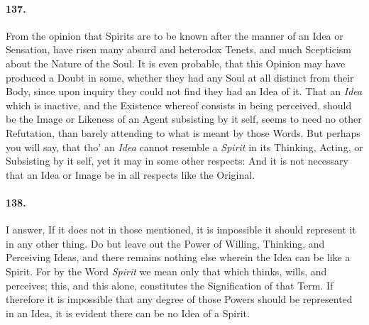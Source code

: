 \documentclass[]{article}
\newenvironment{sectionbody}{\begin{multicols}{2}}{\end{multicols}}
\begin{document}
\begin{sectionbody}
\paragraph{137.} From the opinion that Spirits are to be known after the manner of
an Idea or Sensation, have risen many absurd and heterodox
Tenets, and much Scepticism about the Nature of the Soul.  It is
even probable, that this Opinion may have produced a Doubt in
some, whether they had any Soul at all distinct from their Body,
since upon inquiry they could not find they had an Idea of it.
That an \emph{Idea} which is inactive, and the Existence whereof
consists in being perceived, should be the Image or Likeness of
an Agent subsisting by it self, seems to need no other
Refutation, than barely attending to what is meant by those
Words.  But perhaps you will say, that tho' an \emph{Idea}
cannot resemble a \emph{Spirit} in its Thinking, Acting, or
Subsisting by it self, yet it may in some other respects: And it
is not necessary that an Idea or Image be in all respects like
the Original.



\paragraph{138.} I answer, If it does not in those mentioned, it is impossible it
should represent it in any other thing.  Do but leave out the
Power of Willing, Thinking, and Perceiving Ideas, and there
remains nothing else wherein the Idea can be like a Spirit.  For
by the Word \emph{Spirit} we mean only that which thinks, wills,
and perceives; this, and this alone, constitutes the
Signification of that Term.  If therefore it is impossible that
any degree of those Powers should be represented in an Idea, it
is evident there can be no Idea of a Spirit.




\end{sectionbody}
\end{document}
